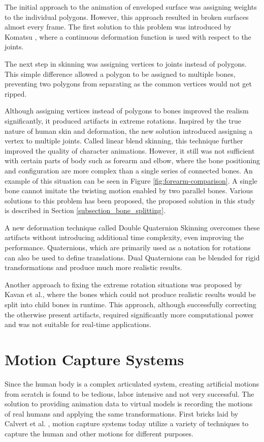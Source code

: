 The initial approach to the animation of enveloped surface was assigning weights to the individual polygons. However, this approach resulted in broken surfaces
almost every frame. The first solution to this problem was introduced by Komatsu \cite{Komatsu1988}, where a continuous deformation function is used with respect 
to the joints. 

The next step in skinning was assigning vertices to joints instead of polygons\cite{Lander1988}. This simple difference allowed a polygon to be assigned to multiple bones, 
preventing two polygons from separating as the common vertices would not get ripped.

Although assigning vertices instead of polygons to bones improved the realism significantly, it produced artifacts in extreme rotations. Inspired by the true 
nature of human skin and deformation, the new solution introduced assigning a vertex to multiple joints. Called linear blend skinning, this technique further 
improved the quality of character animations. However, it still was not sufficient with certain parts of body such as forearm and elbow, where the bone 
positioning and configuration are more complex than a single series of connected bones. An example of this situation can be seen in Figure \ref{fig:forearm-comparison}.
A single bone cannot imitate the twisting motion enabled by two parallel bones. Various solutions to this problem has been proposed, the proposed solution in this study is described in 
Section \ref{subsection_bone_splitting}. 

A new deformation technique called Double Quaternion Skinning overcomes these artifacts without introducing additional time complexity\cite{Kavan2007}, even 
improving the performance. Quaternions, which are primarily used as a notation for rotations can also be used to define translations. Dual Quaternions can 
be blended for rigid transformations and produce much more realistic results.

Another approach to fixing the extreme rotation situations was proposed by Kavan et al.\cite{Kavan2009}, where the bones which could not produce realistic 
results would be split into child bones in runtime. This approach, although successfully correcting the otherwise present artifacts, required significantly more
computational power and was not suitable for real-time applications. 


\section{Motion Capture Systems}
\label{section_related_mocap}
 Since the human body is a complex articulated system, creating artificial motions from scratch is found to be tedious, labor intensive and not very successful.
 The solution to providing animation data to virtual models is recording the motions of real humans and applying the same transformations. First bricks laid by
 Calvert et al. \cite{Calvert1982}, motion capture systems today utilize a variety of techniques to capture the human and other motions for different purposes.
 
